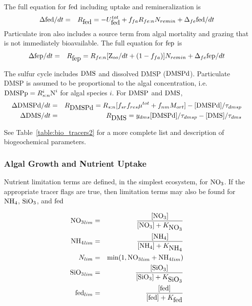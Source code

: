 The full equation for $\mbox{fed}$ including uptake and remineralization is
\begin{eqnarray}
\Delta \mbox{fed}/dt & = & R_{\mbox{fed}} = -U^{tot}_{\mbox{fed}} + f_{fa}R_{fe:n}N_{remin}
+ \Delta_{fe}\mbox{fed}/dt
\end{eqnarray}
Particulate iron also includes a source term from algal mortality and grazing that is not immediately
bioavailable.  The full equation for $\mbox{fep}$ is
\begin{eqnarray}
\Delta \mbox{fep}/dt & = & R_{\mbox{fep}} =  R_{fe:n}[\mbox{Z}_{oo}/dt + (1-f_{fa})]N_{remin}
+ \Delta_{fe}\mbox{fep}/dt
\end{eqnarray}

The sulfur cycle includes $\mbox{DMS}$ and dissolved DMSP ($\mbox{DMSPd}$).
Particulate DMSP is assumed to be proportional to the algal
concentration, i.e. $\mbox{DMSPp} = R^i_{s:n}\mbox{N}^i$ for algal species $i$.
For $\mbox{DMSP}$ and $\mbox{DMS}$,
\begin{eqnarray}
\Delta \mbox{DMSPd}/dt & = & R_{\mbox{DMSPd}} = R_{s:n}[ f_{sr}f_{res}\mu^{tot}
+f_{nm}M_{ort} ] - [\mbox{DMSPd}]/\tau_{dmsp} \nonumber \\
\Delta \mbox{DMS}/dt & = & R_{\mbox{DMS}} =  y_{dms}[\mbox{DMSPd}]/\tau_{dmsp} - [\mbox{DMS}]/\tau_{dms}
\end{eqnarray}

See Table~\ref{table:bio_tracers2} for a more complete list and
description of biogeochemical parameters.

\subsubsection{Algal Growth and Nutrient Uptake}

Nutrient limitation terms are defined, in the simplest ecosystem, for
$\mbox{NO$_3$}$.  If the appropriate tracer
flags are true, then limitation terms may also be found for $\mbox{NH$_4$}$, $\mbox{SiO$_3$}$,
and $\mbox{fed}$

\begin{eqnarray}
\mbox{NO$_3$}_{lim} & = & \frac{[\mbox{NO$_3$}]}{[\mbox{NO$_3$}] + K_{\mbox{NO$_3$}}} \nonumber \\
\mbox{NH$_4$}_{lim} & = & \frac{[\mbox{NH$_4$}]}{[\mbox{NH$_4$}] + K_{\mbox{NH$_4$}}}\nonumber \\
N_{lim} & = &\mbox{min}(1,\mbox{NO$_3$}_{lim} + \mbox{NH$_4$}_{lim}) \nonumber \\
\mbox{SiO$_3$}_{lim} & = & \frac{[\mbox{SiO$_3$}]}{[\mbox{SiO$_3$}] + K_{\mbox{SiO$_3$}}} \nonumber \\
\mbox{fed}_{lim} & = & \frac{[\mbox{fed}]}{[\mbox{fed}] + K_{\mbox{fed}}}
\end{eqnarray}

